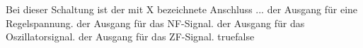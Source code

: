     {Bei dieser Schaltung ist der mit X bezeichnete Anschluss ...}
    {der Ausgang für eine Regelspannung.}
    {der Ausgang für das NF-Signal.}
    {der Ausgang für das Oszillatorsignal.}
    {der Ausgang für das ZF-Signal.}
    {true}{false}